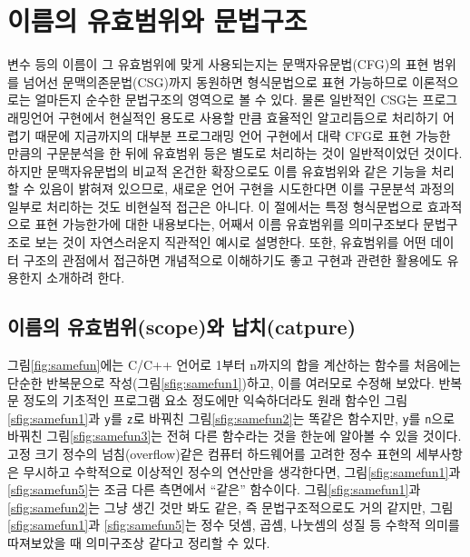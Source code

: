 \section{이름의 유효범위와 문법구조}
변수 등의 이름이 그 유효범위에 맞게 사용되는지는 문맥자유문법(CFG)의
표현 범위를 넘어선 문맥의존문법(CSG)까지 동원하면 형식문법으로 표현
가능하므로 이론적으로는 얼마든지 순수한 문법구조의 영역으로 볼 수 있다.
물론 일반적인 CSG는 프로그래밍언어 구현에서 현실적인 용도로 사용할 만큼
효율적인 알고리듬으로 처리하기 어렵기 때문에 지금까지의 대부분 프로그래밍
언어 구현에서 대략 CFG로 표현 가능한 만큼의 구문분석을 한 뒤에
유효범위 등은 별도로 처리하는 것이 일반적이었던 것이다. 하지만
문맥자유문법의 비교적 온건한 확장\cite{Okhotin2005existence}으로도
이름 유효범위와 같은 기능을 처리할 수 있음이 밝혀져 있으므로, 새로운
언어 구현을 시도한다면 이를 구문분석 과정의 일부로 처리하는 것도
비현실적 접근은 아니다. 이 절에서는 특정 형식문법으로 효과적으로
표현 가능한가에 대한 내용보다는, 어째서 이름 유효범위를 의미구조보다
문법구조로 보는 것이 자연스러운지 직관적인 예시로 설명한다. 또한,
유효범위를 어떤 데이터 구조의 관점에서 접근하면 개념적으로 이해하기도
좋고 구현과 관련한 활용에도 유용한지 소개하려 한다.

\subsection{이름의 유효범위(scope)와 납치(catpure)}
그림\;\ref{fig:samefun}에는 C/C++ 언어로 1부터 n까지의 합을 계산하는 함수를
처음에는 단순한 반복문으로 작성(그림\;\ref{sfig:samefun1})하고, 이를 여러모로
수정해 보았다. 반복문 정도의 기초적인 프로그램 요소 정도에만 익숙하더라도
원래 함수인 그림\;\ref{sfig:samefun1}과 \texttt{y}를 \texttt{z}로 바꿔친
그림\;\ref{sfig:samefun2}는 똑같은 함수지만, \texttt{y}를 \texttt{n}으로
바꿔친 그림\;\ref{sfig:samefun3}는 전혀 다른 함수라는 것을 한눈에 알아볼 수
있을 것이다. 고정 크기 정수의 넘침(overflow)같은 컴퓨터 하드웨어를 고려한 
정수 표현의 세부사항은 무시하고 수학적으로 이상적인 정수의 연산만을 생각한다면,
그림\;\ref{sfig:samefun1}과 \ref{sfig:samefun5}는 조금 다른 측면에서
``같은'' 함수이다. 그림\;\ref{sfig:samefun1}과 \ref{sfig:samefun2}는
그냥 생긴 것만 봐도 같은, 즉 문법구조적으로도 거의 같지만,
그림\;\ref{sfig:samefun1}과 \ref{sfig:samefun5}는 정수 덧셈, 곱셈, 나눗셈의
성질 등 수학적 의미를 따져보았을 때 의미구조상 같다고 정리할 수 있다.

